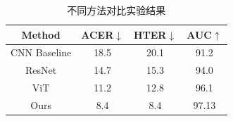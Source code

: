 \begin{table}[H]
\centering
\caption{不同方法对比实验结果}
\begin{tabular}{cccc}
\toprule
Method & ACER$\downarrow$ & HTER$\downarrow$ & AUC$\uparrow$ \\
\midrule
CNN Baseline & 18.5 & 20.1 & 91.2 \\
ResNet & 14.7 & 15.3 & 94.0 \\
ViT & 11.2 & 12.8 & 96.1 \\
Ours & 8.4 & 8.4 & 97.13 \\
\bottomrule
\end{tabular}
\label{tab:comparison}
\end{table}
